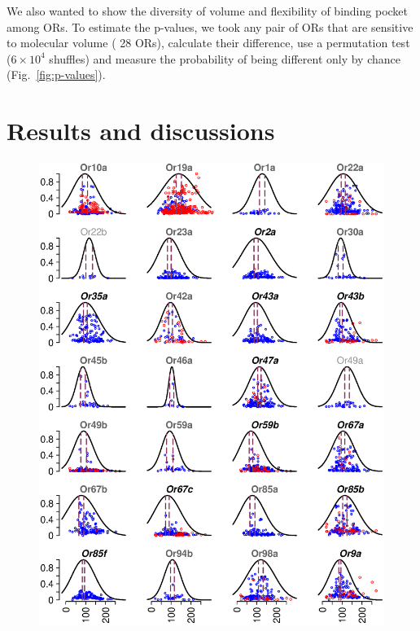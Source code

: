 \documentclass[11pt]{paper} %
\newcommand{\numberofreceptors}{ 28 }
\begin{document}
We also wanted to show the diversity of volume and flexibility of binding pocket among ORs.
To estimate the p-values, 
we took any pair of ORs that are sensitive to molecular volume (\numberofreceptors ORs),
calculate their difference, 
use a permutation test ($6\times10^4$ shuffles) and measure the probability of being different only by chance (Fig.~\ref{fig:p-values}).


\section*{Results and discussions}
\begin{figure}
	\centering
		\includegraphics[width= \textwidth]{vol-res-}
		\label{fig:vol-res:all}		

\end{figure}
\end{document}
